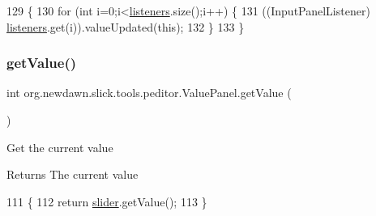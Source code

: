 \begin{DoxyCode}
129                                             \{
130         \textcolor{keywordflow}{for} (\textcolor{keywordtype}{int} i=0;i<\mbox{\hyperlink{classorg_1_1newdawn_1_1slick_1_1tools_1_1peditor_1_1_value_panel_ae8be70f5fbf496c47f1b1c5cb9e3c1fa}{listeners}}.size();i++) \{
131             ((InputPanelListener) \mbox{\hyperlink{classorg_1_1newdawn_1_1slick_1_1tools_1_1peditor_1_1_value_panel_ae8be70f5fbf496c47f1b1c5cb9e3c1fa}{listeners}}.get(i)).valueUpdated(\textcolor{keyword}{this});
132         \}
133     \}
\end{DoxyCode}
\mbox{\label{classorg_1_1newdawn_1_1slick_1_1tools_1_1peditor_1_1_value_panel_a7305b51023972797f8079b7df81032f8}} 
\subsubsection{\texorpdfstring{get\+Value()}{getValue()}}
{\footnotesize\ttfamily int org.\+newdawn.\+slick.\+tools.\+peditor.\+Value\+Panel.\+get\+Value (\begin{DoxyParamCaption}{ }\end{DoxyParamCaption})\hspace{0.3cm}{\ttfamily [inline]}}

Get the current value

\begin{DoxyReturn}{Returns}
The current value 
\end{DoxyReturn}

\begin{DoxyCode}
111                           \{
112         \textcolor{keywordflow}{return} \mbox{\hyperlink{classorg_1_1newdawn_1_1slick_1_1tools_1_1peditor_1_1_value_panel_a7b5cc531a99541b95b43875ab0e9766f}{slider}}.getValue();
113     \}
\end{DoxyCode}
\mbox{\label{classorg_1_1newdawn_1_1slick_1_1tools_1_1peditor_1_1_value_panel_a25dc49b1a78fa4c8e1556520343bf605}} 

